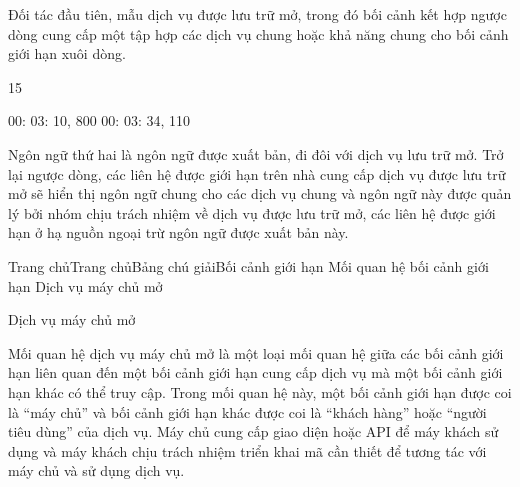 Đối tác đầu tiên, mẫu dịch vụ được lưu trữ mở, trong đó bối cảnh kết hợp ngược dòng cung cấp một tập hợp các dịch vụ chung hoặc khả năng chung cho bối cảnh giới hạn xuôi dòng.

15

00: 03: 10, 800 00: 03: 34, 110

Ngôn ngữ thứ hai là ngôn ngữ được xuất bản, đi đôi với dịch vụ lưu trữ mở. Trở lại ngược dòng, các liên hệ được giới hạn trên nhà cung cấp dịch vụ được lưu trữ mở sẽ hiển thị ngôn ngữ chung cho các dịch vụ chung và ngôn ngữ này được quản lý bởi nhóm chịu trách nhiệm về dịch vụ được lưu trữ mở, các liên hệ được giới hạn ở hạ nguồn ngoại trừ ngôn ngữ được xuất bản này.















Trang chủTrang chủBảng chú giảiBối cảnh giới hạn Mối quan hệ bối cảnh giới hạn Dịch vụ máy chủ mở

Dịch vụ máy chủ mở

Mối quan hệ dịch vụ máy chủ mở là một loại mối quan hệ giữa các bối cảnh giới hạn liên quan đến một bối cảnh giới hạn cung cấp dịch vụ mà một bối cảnh giới hạn khác có thể truy cập. Trong mối quan hệ này, một bối cảnh giới hạn được coi là “máy chủ” và bối cảnh giới hạn khác được coi là “khách hàng” hoặc “người tiêu dùng” của dịch vụ. Máy chủ cung cấp giao diện hoặc API để máy khách sử dụng và máy khách chịu trách nhiệm triển khai mã cần thiết để tương tác với máy chủ và sử dụng dịch vụ.

